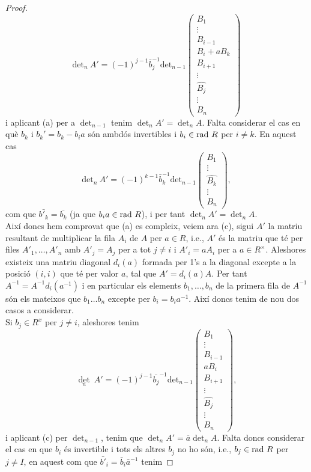 \begin{proof}
 $$
 \text{det}_n \ A' = (-1)^{j-1}\bar{b}_j^{-1}\text{det}_{n-1}\left( \begin{matrix}
  B_1  \\
  \vdots \\
  B_{i-1} \\
  B_i + aB_k \\
  B_{i+1}\\
  \vdots \\
  \hat{B_j} \\
  \vdots \\
  B_n 
 \end{matrix} \right)
 $$
i aplicant (a) per a $\det_{n-1}$ tenim $\det_n A' = \det_n A$. Falta considerar el cas en què $b_k$ i $b_k'=b_k - b_i a$ són ambdós invertibles i $b_i \in \mathrm{rad} \  R$ per $i\neq k$. En aquest cas
$$
\text{det}_n \ A' = (-1)^{k-1} \bar{b}_k^{-1}\text{det}_{n-1} \left(\begin{matrix}
  B_1  \\
  \vdots \\
  \hat{B_k} \\
  \vdots \\
  B_n 
 \end{matrix} \right),
$$
com que $\bar{b'_k}=\bar{b_k}$ (ja que $b_ia\in \mathrm{rad} \  R$), i per tant $\det_n A' = \det_n A$.\\
 \indent Així doncs hem comprovat que (a) es compleix, veiem ara (c), sigui $A'$ la matriu resultant de multiplicar la fila $A_i$ de $A$ per $a\in R$, i.e., $A'$ és la matriu que té per files $A'_1,\dots, A'_n$ amb $A'_j=A_j$ per a tot $j\neq i$ i $A'_i=aA_i$ per a $a\in R^\times$. Aleshores existeix una matriu diagonal $d_i(a)$ formada per 1's a la diagonal excepte a la posició $(i,i)$ que té per valor $a$, tal que $A'=d_i(a)A$. Per tant $A^{-1}=A^{-1}d_i(a^{-1})$ i en particular els elements $b_1,\dots , b_n$ de la primera fila de $A^{-1}$ són els mateixos que $b_1\dots b_n$ excepte per $b_i = b_i a^{-1}$. Així doncs tenim de nou dos casos a considerar. \\
 Si $b_j \in R^x$ per $j\neq i$, aleshores tenim
 $$
 \det_n \ A' = (-1)^{j-1}\bar{b_j}^{-1} \text{det}_{n-1}
 \left(\begin{matrix}
  B_1  \\
  \vdots \\
 {B_{i-1}} \\
  {aB_{i}} \\
   {B_{i+1}} \\
  \vdots \\
  \hat{B_j} \\
  \vdots \\
  B_n 
 \end{matrix} \right),
 $$
i aplicant (c) per $\det_{n-1}$, tenim que $\det_n A' =\overline{a} \det_n A$. Falta doncs considerar el cas en que $b_i$ és invertible i tots els altres $b_j$ no ho són, i.e., $b_j \in \mathrm{rad} \  R$ per $j\neq I$, en aquest com que $\bar{b'}_i=\bar{b}_i\bar{a}^{-1}$ tenim


\end{proof}
